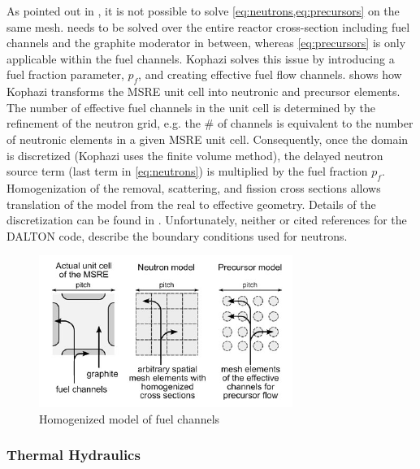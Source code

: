 \documentclass{article}
\let\Oldsubsubsection\subsubsection
\renewcommand{\subsubsection}{\FloatBarrier\Oldsubsubsection}
\begin{document}
As pointed out in \cite{kophazi_development_????}, it is not possible to solve
\cref{eq:neutrons,eq:precursors} on the same mesh.  needs to
be solved over the entire reactor cross-section including fuel channels and the
graphite moderator in between, whereas \cref{eq:precursors} is only applicable
within the fuel channels. Kophazi solves this issue by introducing a fuel
fraction parameter, $p_f$, and creating effective fuel flow
channels.  shows how Kophazi transforms the \gls{MSRE} unit
cell into neutronic and precursor elements. The number of effective fuel
channels in the unit cell is determined by the refinement of the neutron grid,
e.g. the \# of channels is equivalent to the number of neutronic elements in a
given \gls{MSRE} unit cell. Consequently, once the domain is discretized (Kophazi uses
the finite volume method), the delayed neutron source term (last term in
\cref{eq:neutrons}) is multiplied by the fuel fraction $p_f$. Homogenization of
the removal, scattering, and fission cross sections allows translation of the
model from the real to effective geometry. Details of the discretization can be
found in \cite{kophazi_development_????}. Unfortunately, neither
\cite{kophazi_development_????} or cited references for the DALTON code,
describe the boundary conditions used for neutrons.

\begin{figure}[htpb]
  \centering
  \includegraphics[max height=.5\textheight,max width=\textwidth,keepaspectratio]{kophazi_neutronics_discretization.png}
  \caption{Homogenized model of fuel channels \cite{kophazi_development_????}}
  \label{fig:kophazi_homo}
\end{figure}

\subsubsection{Thermal Hydraulics}
\end{document}
